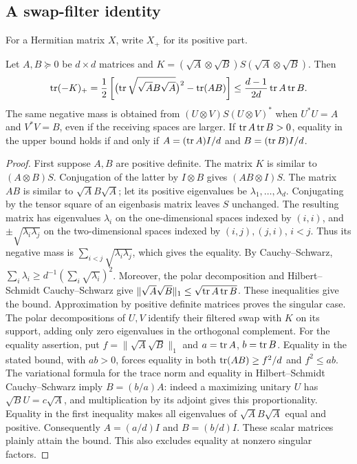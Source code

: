 \subsection{A swap-filter identity}
For a Hermitian matrix $X$, write $X_+$ for its positive part.
\begin{lemma}\label{lem:swapfilter90}
Let $A,B\succeq0$ be $d\times d$ matrices and
$K=(\sqrt A\otimes\sqrt B)S(\sqrt A\otimes\sqrt B)$.  Then
\begin{equation}\label{eq:swapfilter90}
 \operatorname{tr}(-K)_+=\frac12\left[
  \bigl(\operatorname{tr}\sqrt{\sqrt A B\sqrt A}\bigr)^2-\operatorname{tr}(AB)\right]
 \le\frac{d-1}{2d}\operatorname{tr} A\operatorname{tr} B.
\end{equation}
The same negative mass is obtained from $(U\otimes V)S(U\otimes V)^*$
when $U^*U=A$ and $V^*V=B$, even if the receiving spaces are larger.
If $\operatorname{tr} A\operatorname{tr} B>0$, equality in the upper bound holds if and only if
$A=(\operatorname{tr} A)I/d$ and $B=(\operatorname{tr} B)I/d$.
\end{lemma}
\begin{proof}
First suppose $A,B$ are positive definite.  The matrix $K$ is similar
to $(A\otimes B)S$.  Conjugation of the latter by $I\otimes B$ gives
$(AB\otimes I)S$.  The matrix $AB$ is similar to $\sqrt A B\sqrt A$;
let its positive eigenvalues be $\lambda_1,\ldots,\lambda_d$.
Conjugating by the tensor square of an eigenbasis matrix leaves $S$
unchanged.  The resulting matrix has eigenvalues $\lambda_i$ on the
one-dimensional spaces indexed by $(i,i)$, and
$\pm\sqrt{\lambda_i\lambda_j}$ on the two-dimensional spaces indexed
by $(i,j),(j,i)$, $i<j$.  Thus its negative mass is
$\sum_{i<j}\sqrt{\lambda_i\lambda_j}$, which gives the equality.
By Cauchy--Schwarz,
$\sum_i\lambda_i\ge d^{-1}(\sum_i\sqrt{\lambda_i})^2$.
Moreover, the polar decomposition and Hilbert--Schmidt Cauchy--Schwarz
give $\|\sqrt A\sqrt B\|_1\le\sqrt{\operatorname{tr} A\operatorname{tr} B}$.
These inequalities give the bound.  Approximation by positive definite
matrices proves the singular case.  The polar decompositions of $U,V$
identify their filtered swap with $K$ on its support, adding only zero
eigenvalues in the orthogonal complement.
For the equality assertion, put $f=\|\sqrt A\sqrt B\|_1$ and
$a=\operatorname{tr} A$, $b=\operatorname{tr} B$.  Equality in the stated bound, with $ab>0$,
forces equality in both $\operatorname{tr}(AB)\ge f^2/d$ and $f^2\le ab$.
The variational formula for the trace norm and equality in
Hilbert--Schmidt Cauchy--Schwarz imply $B=(b/a)A$: indeed a maximizing
unitary $U$ has $\sqrt B U=c\sqrt A$, and multiplication by its
adjoint gives this proportionality.  Equality in the first inequality
makes all eigenvalues of $\sqrt A B\sqrt A$ equal and positive.
Consequently $A=(a/d)I$ and $B=(b/d)I$.  These scalar matrices plainly
attain the bound.  This also excludes equality at nonzero singular
factors.
\end{proof}

